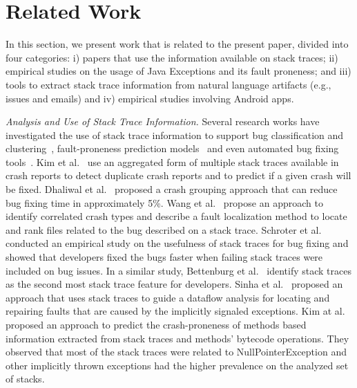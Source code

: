 \documentclass[conference]{IEEEtran}
\begin{document}
\section{Related Work}
\label{sec:rele}

In this section, we present work that is related to the present paper, divided into
four categories: i) papers that use the information available on stack traces;
ii) empirical studies on the usage of Java Exceptions and its fault proneness;
and iii) tools to extract stack trace information from natural language artifacts
(e.g., issues and emails) and iv) empirical studies involving Android apps.

\textit{Analysis and Use of Stack Trace Information.} Several research works have
investigated the use of stack trace information to support bug classification
and clustering~\cite{wang2013improving, kim2011crash, dhaliwal2011classifying},
fault-proneness prediction models~\cite{kim2013predicting} and even automated
bug fixing tools~\cite{sinha2009fault}. Kim et al.~\cite{kim2011crash} use an
aggregated form of multiple stack traces available in crash reports to detect
duplicate crash reports and to predict if a given crash will be fixed. Dhaliwal
et al.~\cite{dhaliwal2011classifying} proposed a crash grouping approach that
can reduce bug fixing time in approximately 5\%. Wang et
al.~\cite{wang2013improving} propose an approach to identify correlated crash
types and describe a fault localization method to locate and rank files related
to the bug described on a stack trace. Schroter et al.~\cite{schroter2010stack}
conducted an empirical study on the usefulness of stack traces for bug fixing
and showed that developers fixed the bugs faster when failing stack traces were
included on bug issues.  In a similar study, Bettenburg et
al.~\cite{bettenburg2008makes} identify stack traces as the second most stack
trace feature for developers.  Sinha et al.~\cite{sinha2009fault} proposed an
approach that uses stack traces to guide a dataflow analysis for locating and
repairing faults that are caused by the implicitly signaled exceptions. Kim
at al.~\cite{kim2013predicting} proposed an approach to predict the
crash-proneness of methods based information extracted from stack traces and
methods' bytecode operations.  They observed that most of the stack traces were
related to NullPointerException and other implicitly thrown exceptions had
the higher prevalence on the analyzed set of stacks.
\end{document}
